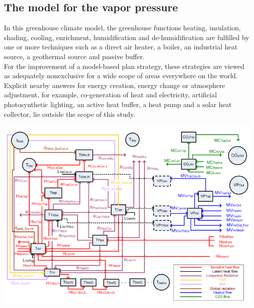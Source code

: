 \subsection{The model for the vapor pressure}
\indent In this greenhouse climate model, the greenhouse functions heating, insulation, shading, cooling,  enrichment, humidification and de-humidification are fulfilled by one or more techniques such as a direct air heater, a boiler, an industrial heat source, a geothermal source and passive buffer.\\
\indent For the improvement of a model-based plan strategy, these strategies are viewed as adequately nonexclusive for a wide scope of areas everywhere on the world. Explicit nearby answers for energy creation, energy change or atmosphere adjustment, for example,  co-generation  of  heat  and  electricity,  artificial  photosynthetic  lighting,  an  active heat buffer, a heat pump and a solar heat collector, lie outside the scope of this study. \\
\begin{center}
    \includegraphics[width=14cm]{Image/Fi2.png}
\end{center}
